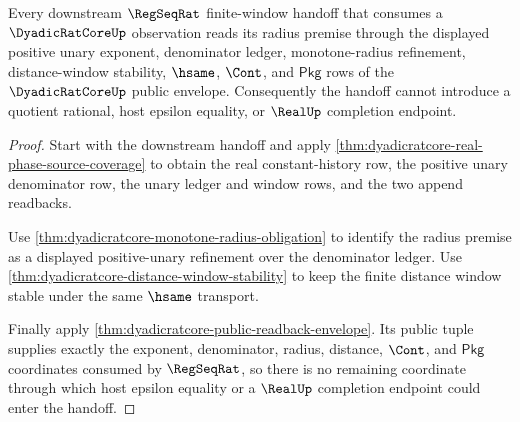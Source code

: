 \begin{theorem}
\label{thm:dyadicratcore-regseqrat-window-radius-handoff}
Every downstream $\RegSeqRat$ finite-window handoff that consumes a
$\DyadicRatCoreUp$ observation reads its radius premise through the displayed
positive unary exponent, denominator ledger, monotone-radius refinement,
distance-window stability, $\hsame$, $\Cont$, and $\mathsf{Pkg}$ rows of the
$\DyadicRatCoreUp$ public envelope. Consequently the handoff cannot introduce
a quotient rational, host epsilon equality, or $\RealUp$ completion endpoint.
\end{theorem}
\begin{proof}
Start with the downstream handoff and apply
\autoref{thm:dyadicratcore-real-phase-source-coverage} to obtain the real
constant-history row, the positive unary denominator row, the unary ledger and
window rows, and the two append readbacks.

Use \autoref{thm:dyadicratcore-monotone-radius-obligation} to identify the
radius premise as a displayed positive-unary refinement over the denominator
ledger. Use \autoref{thm:dyadicratcore-distance-window-stability} to keep the
finite distance window stable under the same $\hsame$ transport.

Finally apply \autoref{thm:dyadicratcore-public-readback-envelope}. Its public
tuple supplies exactly the exponent, denominator, radius, distance, $\Cont$,
and $\mathsf{Pkg}$ coordinates consumed by $\RegSeqRat$, so there is no
remaining coordinate through which host epsilon equality or a $\RealUp$
completion endpoint could enter the handoff.
\end{proof}

